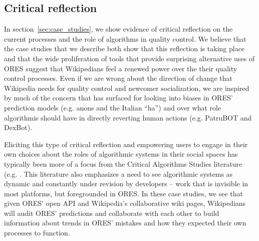 \subsection{Critical reflection}
In section~\ref{sec:case_studies}, we show evidence of critical reflection on the current processes and the role of algorithms in quality control.  We believe that the case studies that we describe both show that this reflection is taking place and that the wide proliferation of tools that provide surprising alternative uses of ORES suggest that Wikipedians feel a renewed power over the their quality control processes.  Even if we are wrong about the direction of change that Wikipedia needs for quality control and newcomer socialization, we are inspired by much of the concern that has surfaced for looking into biases in ORES' prediction models (e.g. anons and the Italian ``ha'') and over what role algorithmis should have in directly reverting human actions (e.g. PatruBOT and DexBot).

Eliciting this type of critical reflection and empowering users to engage in their own choices about the roles of algorithmic systems in their social spaces has typically been more of a focus from the Critical Algorithms Studies literature (e.g. \cite{barocas2013governing, kitchin2017thinking}. This literature also emphasizes a need to see algorithmic systems as dynamic and constantly under revision by developers \cite{seaver2017algorithms} -- work that is invisible in most platforms, but foregrounded in ORES. In these case studies, we see that given ORES' open API and Wikipedia's collaborative wiki pages, Wikipedians will audit ORES' predictions and collaborate with each other to build information about trends in ORES' mistakes and how they expected their own processes to function.

